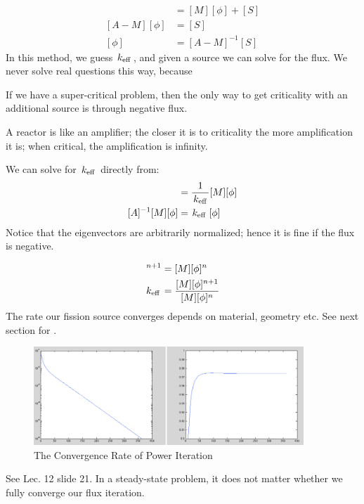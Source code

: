 \documentclass{school-22.211-notes}
\begin{document}
\begin{align}
[A] [\phi] &= [M] [\phi] + [S] \\
[A - M ] [\phi] &= [S] \\
[\phi] &= [A - M]^{-1} [S]
\end{align}
In this method, we guess $\left. k_{\mathrm{eff}} \right.$, and given a source we can solve for the flux. We never solve real questions this way, because 

If we have a super-critical problem, then the only way to get criticality with an additional source is through negative flux. 

A reactor is like an amplifier; the closer it is to criticality the more amplification it is; when critical, the amplification is infinity. 


We can solve for $\left. k_{\mathrm{eff}} \right.$ directly from: 
\begin{align}
[A] [\phi] &= \frac{1}{\keff} [M] [\phi] \\
[A]^{-1} [M] [\phi] &= \keff [\phi]
\end{align}
Notice that the eigenvectors are arbitrarily normalized; hence it is fine if the flux is negative. 


\begin{align}
[A] [\phi]^{n+1} &= [M] [\phi]^n \\
\keff &= \frac{[M][\phi]^{n+1} }{[M] [\phi]^n} 
\end{align}
The rate our fission source converges depends on material, geometry etc. See next section for . 
\begin{figure}
  \centering
  \includegraphics[width=4in]{images/dfs/power-iteration-convergence.png}
  \caption{The Convergence Rate of Power Iteration}
\end{figure}

See Lec. 12 slide 21. In a steady-state problem, it does not matter whether we fully converge our flux iteration. 
\end{document}
